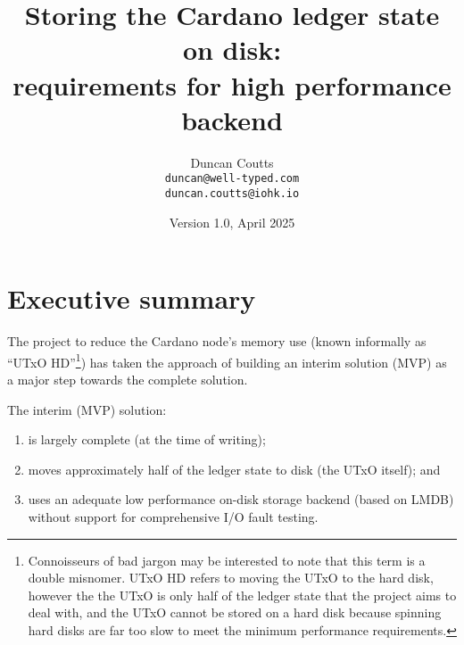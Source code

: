 \documentclass[11pt,a4paper]{article}
\begin{document}
\title{Storing the Cardano ledger state on disk: \\
       requirements for high performance backend}
\date{Version 1.0, April 2025}
\author{Duncan Coutts \\ {\small \texttt{duncan@well-typed.com}} \\
                         {\small \texttt{duncan.coutts@iohk.io}}
       }

\maketitle

\begin{changelog}[simple, sectioncmd=\section*]
\end{changelog}

\setcounter{tocdepth}{2}
\tableofcontents

\section{Executive summary}

The project to reduce the Cardano node's memory use (known informally as
``UTxO HD''\footnote{Connoisseurs of bad jargon may be interested to note that
this term is a double misnomer. UTxO HD refers to moving the UTxO to the hard
disk, however the the UTxO is only half of the ledger state that the project
aims to deal with, and the UTxO cannot be stored on a hard disk because
spinning hard disks are far too slow to meet the minimum performance
requirements.}) has taken the approach of building an interim solution (MVP) as
a major step towards the complete solution.

The interim (MVP) solution:
\begin{enumerate}
\item is largely complete (at the time of writing);
\item moves approximately half of the ledger state to disk (the UTxO itself);
      and
\item uses an adequate low performance on-disk storage backend (based on LMDB)
      without support for comprehensive I/O fault testing.
\end{enumerate}
\end{document}

